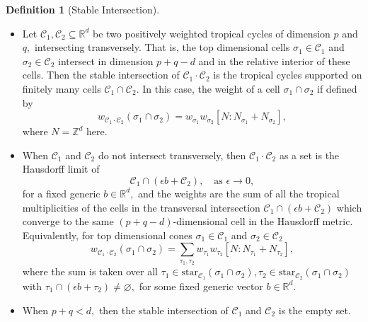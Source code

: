 \documentclass[11pt]{amsart}
\theoremstyle{definition}
\newtheorem{definition}[theorem]{Definition}
\newcommand{\R}{\mathbb{R}}
\newcommand{\Z}{\mathbb{Z}}
\newcommand{\cC}{\mathcal{C}}
\begin{document}
\begin{definition}[Stable Intersection]\label{def:stable-int}
\begin{itemize}
    \item [(a)] Let $\cC_1, \cC_2 \subseteq \R^d$ be two positively weighted tropical cycles of dimension $p$ and $q,$ intersecting transversely. That is, the top dimensional cells $\sigma_1 \in \cC_1$ and $\sigma_2 \in \cC_2$ intersect in dimension $p+q-d$ and in the relative interior of these cells.  Then the stable intersection of $\cC_1 \cdot \cC_2$ is the tropical cycles supported on finitely many cells $\cC_1 \cap \cC_2.$ In this case, the weight of a cell $\sigma_1 \cap \sigma_2$ if defined by
    \[
    w_{\cC_1 \cdot \cC_2} (\sigma_1 \cap \sigma_2) = w_{\sigma_1} w_{\sigma_2} [N: {N}_{\sigma_1} + {N}_{\sigma_2}],
    \]
    where $N = \Z^d$ here.  
    \item [(b)] When $\cC_1$ and $\cC_2$ do not intersect transversely, then  $\cC_1 \cdot \cC_2$ as a set is the Hausdorff limit of 
    $$\cC_1 \cap  (\epsilon b + \cC_2), \quad \text{as $\epsilon \to 0$},$$ 
    for a fixed generic $b \in \R^d,$ and the weights are the sum of all the tropical multiplicities of the cells in the transversal intersection $\cC_1 \cap (\epsilon b + \cC_2)$ which converge to the same $(p+q-d)$-dimensional cell in the Hausdorff metric. Equivalently, for top dimensional cones $\sigma_1 \in \cC_1$ and $\sigma_2 \in \cC_2$
     \[
    w_{\cC_1 \cdot \cC_2} (\sigma_1 \cap \sigma_2) = \sum_{\tau_1, \tau_2} w_{\tau_1} w_{\tau_2} [{N}: {N}_{\tau_1} + {N}_{\tau_2}],
    \]
 where the sum is taken over all $\tau_1 \in \text{star}_{\cC_1}(\sigma_1 \cap \sigma_2), \tau_2 \in \text{star}_{\cC_2}(\sigma_1 \cap \sigma_2)$ with $\tau_1 \cap (\epsilon b + \tau_2) \neq \varnothing,$ for some fixed generic vector $b \in \mathbb{R}^d.$

 \item [(c)]  When $p+q < d,$ then the stable intersection of $\cC_1$ and $\cC_2$ is the empty set. 


    
\end{itemize}


    
\end{definition}
\end{document}
